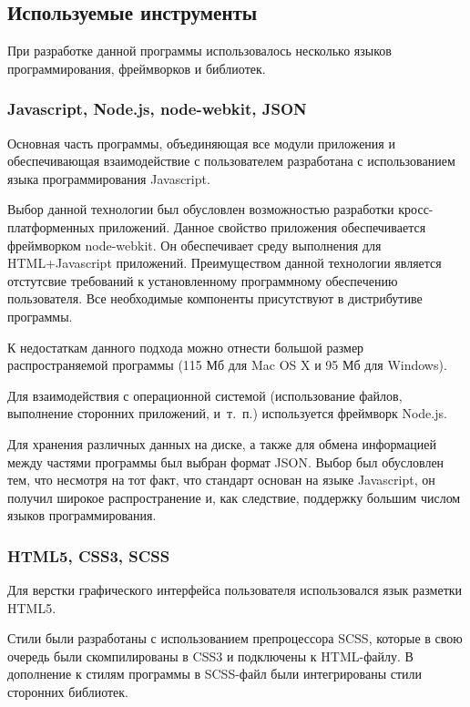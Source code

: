 \subsection{Используемые инструменты}

При разработке данной программы использовалось несколько языков программирования, фреймворков и библиотек.

\subsubsection{Javascript, Node.js, node-webkit, JSON}

Основная часть программы, объединяющая все модули приложения и обеспечивающая взаимодействие с пользователем разработана с использованием языка программирования Javascript.

Выбор данной технологии был обусловлен возможностью разработки кросс-платформенных приложений. Данное свойство приложения обеспечивается фреймворком node-webkit\cite{nwjs}. Он обеспечивает среду выполнения для HTML+Javascript приложений. Преимуществом данной технологии является отстутсвие требований к установленному программному обеспечению пользователя. Все необходимые компоненты присутствуют в дистрибутиве программы.

К недостаткам данного подхода можно отнести большой размер распространяемой программы (115 Мб для Mac OS X и 95 Мб для Windows).

Для взаимодействия с операционной системой (использование файлов, выполнение сторонних приложений, и~т.~п.) используется фреймворк Node.js\cite{nodejs}.

Для хранения различных данных на диске, а также для обмена информацией между частями программы был выбран формат JSON\cite{json}. Выбор был обусловлен тем, что несмотря на тот факт, что стандарт основан на языке Javascript, он получил широкое распространение и, как следствие, поддержку большим числом языков программирования.

\subsubsection{HTML5, CSS3, SCSS}
Для верстки графического интерфейса пользователя использовался язык разметки HTML5.

Стили были разработаны с использованием препроцессора SCSS\cite{scss}, которые в свою очередь были скомпилированы  в CSS3 и подключены к HTML-файлу. В дополнение к стилям программы в SCSS-файл были интегрированы стили сторонних библиотек.

